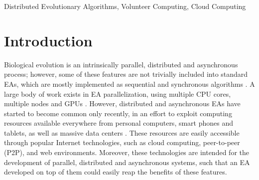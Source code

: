 \documentclass[conference]{IEEEtran}
\begin{document}
\begin{IEEEkeywords}
  Distributed Evolutionary Algorithms, Volunteer Computing,
  Cloud Computing
\end{IEEEkeywords}

\section{Introduction}

Biological evolution is an intrinsically parallel, distributed and
asynchronous process; however, some of these features are not
trivially included into standard EAs, which are mostly implemented as
sequential and synchronous algorithms \cite{eiben}.  A large body of
work exists in EA parallelization, using multiple CPU cores, multiple
nodes and GPUs \cite{cantu2000efficient,hofmann2013performance}.
However, distributed and asynchronous EAs have started to become
common only recently, in an effort to exploit computing resources
available everywhere from personal computers, smart phones and
tablets, as well as massive data centers \cite{agajaj,FlexGP}.  These
resources are easily accessible through popular Internet technologies,
such as cloud computing, peer-to-peer (P2P), and web
environments. Moreover, these technologies are intended for the
development of parallel, distributed and asynchronous systems, such
that an EA developed on top of them could easily reap the benefits of
these features.
\end{document}
